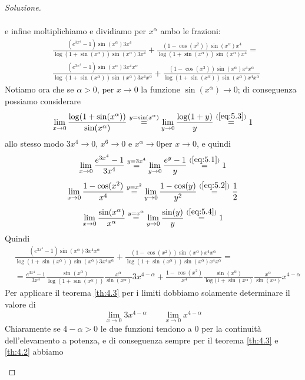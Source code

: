 \begin{proof}[Soluzione]
\begin{enumerate}[(i)]
\[\begin{split}
        \end{split}
        \]
        e infine moltiplichiamo e dividiamo per $x^\alpha$ ambo le frazioni:
        \[
        \begin{split}
            & \frac{(e^{3x^4}-1)\sin(x^\alpha)3x^4}{\log(1+\sin(x^\alpha))\sin(x^\alpha)3x^4}+\frac{(1-\cos(x^2))\sin(x^\alpha)x^4}{\log(1+\sin(x^\alpha))\sin(x^\alpha)x^4} = \\
            & \frac{(e^{3x^4}-1)\sin(x^\alpha)3x^{4}x^\alpha}{\log(1+\sin(x^\alpha))\sin(x^\alpha)3x^4 x^\alpha}+\frac{(1-\cos(x^2))\sin(x^\alpha)x^4x^\alpha}{\log(1+\sin(x^\alpha))\sin(x^\alpha)x^4x^\alpha}
        \end{split}
        \]
        Notiamo ora che se $\alpha>0$, per $x\to 0$ la funzione $\sin(x^\alpha)\to 0$; di conseguenza possiamo considerare
        \[
        \lim_{x\to 0} \frac{\log(1+\sin(x^\alpha))}{\sin(x^\alpha)} \overset{y = \sin(x^\alpha)}{=} \lim_{y\to 0} \frac{\log(1+y)}{y} \overset{(\ref{eq:5.3})}{=} 1
        \]
        allo stesso modo $3x^4\to 0$, $x^6\to 0$ e $x^\alpha\to0$per $x\to 0$, e quindi
        \[
        \lim_{x\to 0} \frac{e^{3x^4}-1}{3x^4} \overset{y = 3x^4}{=} \lim_{y\to 0} \frac{e^y-1}{y}\overset{(\ref{eq:5.1})}{=} 1
        \]
        \[
        \lim_{x\to 0} \frac{1-\cos(x^2)}{x^4} \overset{y = x^2}{=} \lim_{y\to 0} \frac{1-\cos(y)}{y^2} \overset{(\ref{eq:5.2})}{=} \frac{1}{2}
        \]
        \[
        \lim_{x\to 0} \frac{\sin(x^\alpha)}{x^\alpha} \overset{y = x^\alpha}{=} \lim_{y\to 0} \frac{\sin(y)}{y} \overset{(\ref{eq:5.4})}{=} 1
        \]
        Quindi
        \[
        \begin{split}
            & \frac{(e^{3x^4}-1)\sin(x^\alpha)3x^4x^\alpha}{\log(1+\sin(x^\alpha))\sin(x^\alpha)3x^4x^\alpha}+\frac{(1-\cos(x^2))\sin(x^\alpha)x^4x^\alpha}{\log(1+\sin(x^\alpha))\sin(x^\alpha)x^4x^\alpha} = \\
            & = \frac{e^{3x^4}-1}{3x^4}\frac{\sin(x^\alpha)}{\log(1+\sin(x^\alpha))}\frac{x^\alpha}{\sin(x^\alpha)}3x^{4-\alpha}+\frac{1-\cos(x^2)}{x^4}\frac{\sin(x^\alpha)}{\log(1+\sin(x^\alpha)}\frac{x^\alpha}{\sin(x^\alpha)}x^{4-\alpha}
        \end{split}
        \]
        Per applicare il teorema \ref{th:4.3} per i limiti dobbiamo solamente determinare il valore di
        \[
        \lim_{x\to 0} 3x^{4-\alpha} \qquad \lim_{x\to 0} x^{4-\alpha}
        \]
        Chiaramente se $4-\alpha>0$ le due funzioni tendono a 0 per la continuità dell'elevamento a potenza, e di conseguenza sempre per il teorema \ref{th:4.3} e \ref{th:4.2} abbiamo

\end{enumerate}
\end{proof}
